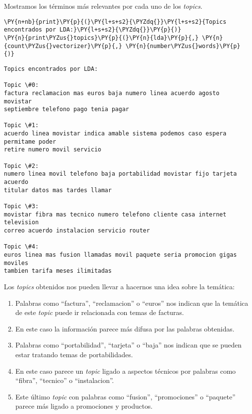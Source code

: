 Mostramos los términos más relevantes por cada uno de los \textit{topics}. 
\vspace{0.5cm}
    \begin{tcolorbox}[breakable, size=fbox, boxrule=1pt, pad at break*=1mm,colback=cellbackground, colframe=cellborder]
\begin{Verbatim}[commandchars=\\\{\}]
\PY{n+nb}{print}\PY{p}{(}\PY{l+s+s2}{\PYZdq{}}\PY{l+s+s2}{Topics encontrados por LDA:}\PY{l+s+s2}{\PYZdq{}}\PY{p}{)}
\PY{n}{print\PYZus{}topics}\PY{p}{(}\PY{n}{lda}\PY{p}{,} \PY{n}{count\PYZus{}vectorizer}\PY{p}{,} \PY{n}{number\PYZus{}words}\PY{p}{)}
\end{Verbatim}
\end{tcolorbox}

    \begin{Verbatim}[commandchars=\\\{\}]
Topics encontrados por LDA:

Topic \#0:
factura reclamacion mas euros baja numero linea acuerdo agosto movistar
septiembre telefono pago tenia pagar

Topic \#1:
acuerdo linea movistar indica amable sistema podemos caso espera permitame poder
retire numero movil servicio

Topic \#2:
numero linea movil telefono baja portabilidad movistar fijo tarjeta acuerdo
titular datos mas tardes llamar

Topic \#3:
movistar fibra mas tecnico numero telefono cliente casa internet television
correo acuerdo instalacion servicio router

Topic \#4:
euros linea mas fusion llamadas movil paquete seria promocion gigas moviles
tambien tarifa meses ilimitadas
    \end{Verbatim}


Los \textit{topics} obtenidos nos pueden llevar a hacernos una idea sobre la temática:

\begin{enumerate}
\item Palabras como ``factura'', ``reclamacion'' o ``euros'' nos indican que la temática de este \textit{topic} puede ir relacionada con temas de facturas.
\item En este caso la información parece más difusa por las palabras obtenidas.
\item Palabras como ``portabilidad'', ``tarjeta'' o ``baja'' nos indican que se pueden estar tratando temas de portabilidades. 
\item En este caso parece un \textit{topic} ligado a aspectos técnicos por palabras como ``fibra'', ``tecnico'' o ``instalacion''.
\item Este último \textit{topic} con palabras como ``fusion'', ``promociones'' o ``paquete'' parece más ligado a promociones y productos. 
\end{enumerate}


